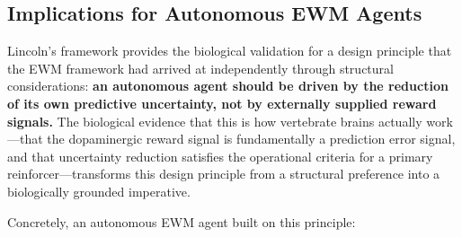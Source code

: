 \documentclass[11pt,a4paper]{article}
\theoremstyle{remark}
\begin{document}
\subsection{Implications for Autonomous EWM Agents}
\label{sec:implications}

Lincoln's framework provides the biological validation for a design principle
that the EWM framework had arrived at independently through structural
considerations: \textbf{an autonomous agent should be driven by the reduction
of its own predictive uncertainty, not by externally supplied reward signals.}
The biological evidence that this is how vertebrate brains actually work---that
the dopaminergic reward signal is fundamentally a prediction error signal, and
that uncertainty reduction satisfies the operational criteria for a primary
reinforcer---transforms this design principle from a structural preference into
a biologically grounded imperative.

Concretely, an autonomous EWM agent built on this principle:
\end{document}
